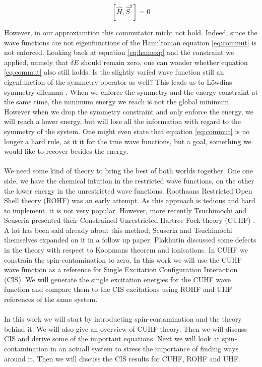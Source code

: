 \documentclass[twoside,twocolumn,9pt]{article}
\begin{document}
\begin{equation}\label{eq:commut}
  [\hat{H}, \hat{S}^2] = 0
\end{equation}

However, in our approxiamtion this commutator micht not hold. Indeed, since the wave functions are not eigenfunctions of the Hamiltonian equation \eqref{eq:commut} is not enforced.
Looking back at equation \eqref{eq:hamexp} and the constraint we applied, namely that $\delta E$ should
remain zero, one can wonder whether equation \eqref{eq:commut} also still holds. Is the slightly varied wave function still an eigenfunction of the symmetry operator as well?
This leads us to Löwdins symmetry dilemma \cite{Lowdin1963}. When we enforce the symmetry and the energy constraint at the same time, the minimum energy we reach is not the
global minimum. However when we drop the symmetry constraint and only enforce the energy, we will reach a lower energy, but will lose all the information with regard to the
symmetry of the system. One might even state that equation \eqref{eq:commut} is no longer a hard rule, as it it for the true wave functions, but a goal, something we would like to
recover besides the energy.
\paragraph*{}
We need some kind of theory to bring the best of both worlds together. One one side, we have the chemical intution in the restricted wave functions, on the other the lower
energy in the unrestricted wave functions. Roothaans Restricted Open Shell theory (ROHF)\cite{Roothaan1960} was an early attempt. As this approach is tedious and hard to implement,
it is not very popular\cite{Scuseria2010, Bally2008}. However, more recently Tsuchimochi and Scuseria presented their Constrained Unrestricted Hartree Fock theory (CUHF)
\cite{Scuseria2010}. A lot has been said
already about this method; Scuseria and Tsuchimochi themselves expanded on it in a follow up paper\cite{Scuseria2011}. Plakhutin discussed some defects in the theory with respect to
Koopmans theorem and ionisations\cite{Plakhutin2014}. In CUHF we constrain the spin-contamination to zero. In this work we will use the CUHF wave function as a reference for
Single Excitation Configuration Interaction (CIS). We will generate the single excitation energies for the CUHF wave function and compare them to the CIS excitations using
ROHF and UHF references of the same system.
\paragraph*{}
In this work we will start by introducting spin-contamination and the theory behind it. We will also give an overview of CUHF theory. Then we will discuss CIS and derive some
of the important equations. Next we will look at spin-contamination in an actuall system to stress the importance of finding ways around it. Then we will discuss the CIS results
for CUHF, ROHF and UHF.
\end{document}

